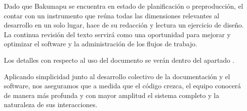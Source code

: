 Dado que Bakumapu se encuentra en estado de planificación o preproducción, el contar con un instrumento que reúna todas las dimensiones relevantes al desarrollo en un solo lugar, hace de su redacción y lectura un ejercicio de diseño. La continua revisión del texto servirá como una oportunidad para mejorar y optimizar el software y la administración de los flujos de trabajo.

Los detalles con respecto al uso del documento se verán dentro del apartado .

Aplicando simplicidad junto al desarrollo colectivo de la documentación y el software, nos aseguramos que a medida que el código crezca, el equipo conocerá de manera más profunda y con mayor amplitud el sistema completo y la naturaleza de sus interacciones.
